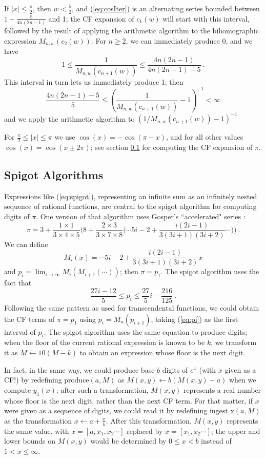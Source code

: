 \documentclass[11pt, oneside]{amsart}   	%
\renewcommand{\:}{\negthickspace:\negthickspace}
\begin{document}
If $|x| \leq \frac{\pi}{2}$, then $w < \frac{5}{2}$, and (\ref{eq:cosIter}) is an alternating series bounded between $1 - \frac{5}{4n(2n-1)}$ and 1; the CF expansion of $c_1(w)$ will start with this interval,  followed by the result of applying the arithmetic algorithm to the bihomographic expression $M_{n,w}(c_2(w))$. For $n \geq 2$, we can immediately produce 0, and we have
\[
1  \leq \frac{1}{M_{n,w}(c_{n+1}(w))} \leq \frac{4n(2n-1)}{4n(2n-1)-5} \ .
\]
This interval in turn lets us immediately produce 1; then
\[
 \frac{4n(2n-1)-5}{5} \leq \left(\frac{1}{M_{n,w}(c_{n+1}(w))} - 1 \right)^{-1} < \infty
\]
and we apply the arithmetic algorithm to $(1/M_{n,w}(c_{n+1}(w)) - 1) ^{-1}$

For $\frac{\pi}{2} \leq |x| \leq \pi$ we use $\cos(x) = -\cos(\pi - x)$, and for all other values $\cos(x) = \cos(x \pm 2\pi)$; see section \ref{sec:spigot} for computing the CF expansion of $\pi$.


\subsection{Spigot Algorithms}\label{sec:spigot}
Expressions like (\ref{eq:spigot}), representing an infinite sum as an infinitely nested sequence of rational functions, are central to the spigot algorithm\cite{Gibbons2016,Rabinowitz2016} for computing digits of $\pi$. One version of that algorithm uses Gosper's ``accelerated" series \cite{acceleration}:
\[
\pi = 3 + \frac{1 \times 1}{3 \times 4 \times 5}\big(8 + \frac{2 \times 3}{3 \times 7 \times 8}\big( \cdots 5i-2 + \frac{i(2i-1)}{3(3i+1)(3i+2)} \cdots \big) \big) \ .
\]
We can define
\[
M_i(x) = \cdots 5i-2 + \frac{i(2i-1)}{3(3i+1)(3i+2)}x
\]
and $p_i = \lim_{i \to \infty} M_i(M_{i+1}(\cdots))$;
then $\pi = p_1$. The spigot algorithm uses the fact that
\begin{equation}\label{eq:pi}
\frac{27i-12}{5} \leq p_i \leq \frac{27}{5}i - \frac{216}{125} \ .
\end{equation}
Following the same pattern as used for transcendental functions, we could obtain the CF terms of $\pi = p_1$ using $p_i = M_n(p_{i+1})$, taking (\ref{eq:pi}) as the first interval of $p_i$. The spigot algorithm uses the same equation to produce digits; when the floor of the current rational expression is known to be $k$, we transform it as $M \leftarrow 10(M-k)$ to obtain an expression whose floor is the next digit.

In fact, in the same way, we could produce base-$b$ digits of $e^x$ (with $x$ given as a CF!) by redefining $\mbox{produce}(a, M)$ as $M(x,y) \leftarrow b(M(x,y) - a)$ when we compute $y_1(x)$;
after such a transformation, $M(x,y)$ represents a real number whose floor is the next digit, rather than the next CF term. 
For that matter, if $x$ were given as a sequence of digits, we could read it by redefining $\mbox{ingest\_x}(a,M)$ as the transformation $x \leftarrow a + \frac{x}{b}$. After this transformation, $M(x,y)$ represents the same value, with $x=[a,x_1,x_2\cdots]$ replaced by $x=[x_1,x_2\cdots]$; the upper and lower bounds on $M(x,y)$ would be determined by $0 \leq x < b$ instead of $1 <  x \leq \infty$.
\end{document}
